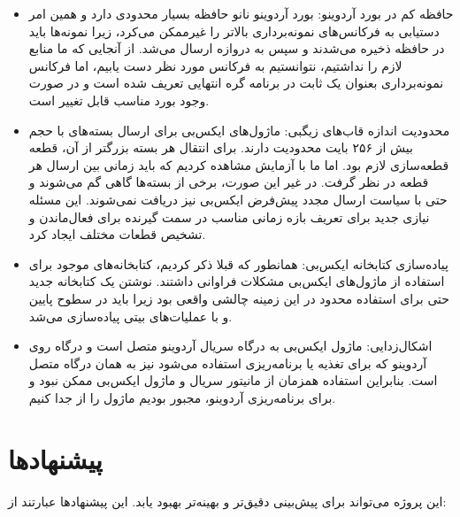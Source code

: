 \begin{itemize}
\item حافظه کم در بورد آردوینو: بورد آردوینو نانو حافظه بسیار محدودی دارد و همین امر دستیابی به فرکانس‌های نمونه‌برداری بالاتر را غیرممکن می‌کرد، زیرا نمونه‌ها باید در حافظه ذخیره می‌شدند و سپس به دروازه ارسال می‌شد. از آنجایی که ما منابع لازم را نداشتیم، نتوانستیم به فرکانس مورد نظر دست یابیم، اما فرکانس نمونه‌برداری بعنوان یک ثابت در برنامه گره انتهایی تعریف شده است و در صورت وجود بورد مناسب قابل تغییر است.
\item محدودیت اندازه قاب‌های زیگبی: ماژول‌های ایکس‌بی برای ارسال بسته‌های با حجم بیش از ۲۵۶ بایت محدودیت دارند. برای انتقال هر بسته بزرگتر از آن، قطعه قطعه‌سازی لازم بود. اما ما با آزمایش مشاهده کردیم که باید زمانی بین ارسال هر قطعه در نظر گرفت. در غیر این صورت، برخی از بسته‌ها گاهی گم می‌شوند و حتی با سیاست ارسال مجدد پیش‌فرض ایکس‌بی نیز دریافت نمی‌شوند. این مسئله نیازی جدید برای تعریف بازه زمانی مناسب در سمت گیرنده برای فعال‌ماندن و تشخیص قطعات مختلف ایجاد کرد.
\item پیاده‌سازی کتابخانه ایکس‌بی: همانطور که قبلا ذکر کردیم، کتابخانه‌های موجود برای استفاده از ماژول‌های ایکس‌بی مشکلات فراوانی داشتند. نوشتن یک کتابخانه جدید حتی برای استفاده محدود در این زمینه چالشی واقعی بود زیرا باید در سطوح پایین و با عملیات‌های بیتی پیاده‌سازی می‌شد.
\item اشکال‌زدایی: ماژول ایکس‌بی به درگاه سریال آردوینو متصل است و درگاه  روی آردوینو که برای تغذیه یا برنامه‌ریزی استفاده می‌شود نیز به همان درگاه متصل است. بنابراین استفاده همزمان از مانیتور سریال و ماژول ایکس‌بی ممکن نبود و برای برنامه‌ریزی آردوینو، مجبور بودیم ماژول را از جدا کنیم.

\end{itemize}

\section{پیشنهادها}

این پروژه می‌تواند برای پیش‌بینی دقیق‌تر و بهینه‌تر بهبود یابد. این پیشنهادها عبارتند از:

